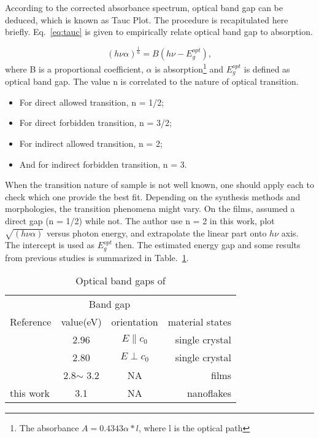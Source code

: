 According to the corrected absorbance spectrum, optical band gap can be deduced, which is known as Tauc Plot.\cite{Tauc1972} The procedure is recapitulated here briefly. Eq.~\ref{eq:tauc} is given to empirically relate optical band gap to absorption.

\begin{equation}\label{eq:tauc}
 (h\nu \alpha)^{\frac{1}{n}} = B(h\nu - E_g^{opt}),
\end{equation}
where B is a proportional coefficient, $\alpha$ is absorption\footnote{The absorbance $A = 0.4343\alpha*l$, where l is the optical path} and $E_g^{opt}$ is defined as optical band gap. The value n is correlated to the nature of optical transition.
\begin{itemize}
\item For direct allowed transition, n = 1/2;
\item For direct forbidden transition, n = 3/2;
\item For indirect allowed transition, n = 2;
\item And for indirect forbidden transition, n = 3.
\end{itemize}

When the transition nature of sample is not well known, one should apply each to check which one provide the best fit. Depending on the synthesis methods and  morphologies, the transition phenomena might vary. On the  films, \citeauthor{Bouzidi2003} assumed a direct gap (n = 1/2)\cite{Bouzidi2003} while \citeauthor{Szekeres2002} not.\cite{Szekeres2002} The author use n = 2 in this work, plot $\sqrt{(h\nu \alpha)}$ versus photon energy, and extrapolate the linear part onto $h\nu$ axis. The intercept is used as $E_g^{opt}$ then. The estimated energy gap and some results from previous studies is summarized in Table.~\ref{tab:mobg}.

\begin{table}[htb]
\centering
\caption{Optical band gaps of }\label{tab:mobg}
\begin{tabular}{lccr}
\toprule
&\multicolumn{2}{c}{Band gap} \\
\cmidrule(l){2-3}
Reference & value(eV) & orientation & material states\\
\midrule
\cite{Deb1968}   & 2.96  & $E\parallel c_0$ & single crystal\\
\cite{Deb1968}   & 2.80  & $E\perp c_0$ & single crystal \\
\cite{Julien1995} & 2.8$\sim$ 3.2 & NA & films\\
 this work  & 3.1  & NA & nanoflakes\\
\bottomrule
\end{tabular}
\end{table}

